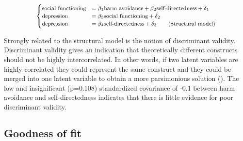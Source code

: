 \documentclass[11pt]{article}
\begin{document}
\begin{table}[h!]
\begin{equation}
\footnotesize
  \begin{cases}
    \textrm{social functioning} & = \beta_1 \textrm{harm avoidance} + \beta_2 \textrm{self-directedness} + \delta_1 \\
    \textrm{depression} & = \beta_3 \textrm{social functioning} + \delta_2 \\
    \textrm{depression} & = \beta_4 \textrm{self-directedness} + \delta_3
    \tag{Structural model}
  \end{cases}
\end{equation}
\captionsetup{singlelinecheck=off}
\caption{Structural model}
\label{tab:base_structural}
\end{table}

Strongly related to the structural model is the notion of discriminant validity.
Discriminant validity gives an indication that theoretically different constructs
should not be highly intercorrelated. In other words, if two latent variables
are highly correlated they could represent the same construct and they could be
merged into one latent variable to obtain a more parsimonious solution
(\cite{brown2015}). The low and insignificant (p=0.108) standardized covariance
of -0.1 between harm avoidance and self-directedness indicates that there is
little evidence for poor discriminant validity.

\subsection{Goodness of fit}
\end{document}
